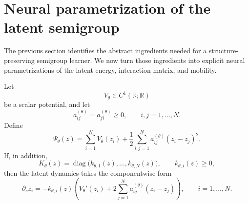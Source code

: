 \documentclass[hidelinks,review,nohypdvips,onefignum,onetabnum]{siamart220329}
\newcommand{\R}{\mathbb{R}}
\newcommand{\diag}{\operatorname{diag}}
\begin{document}
\section{Neural parametrization of the latent semigroup}\label{sec:neural-param}
The previous section identifies the abstract ingredients needed for a structure-preserving semigroup learner. We now turn those ingredients into explicit neural parametrizations of the latent energy, interaction matrix, and mobility.
\begin{definition}\label{def:rd-energy}
Let
\begin{equation}\label{eq:V-type}
V_{\theta}\in C^1(\R;\R)
\end{equation}
be a scalar potential, and let
\begin{equation}\label{eq:A-sym}
a_{ij}^{(\theta)}=a_{ji}^{(\theta)}\ge 0, \qquad i,j=1,\dots,N.
\end{equation}
Define
\begin{equation}\label{eq:rd-energy}
\Psi_{\theta}(z)=\sum_{i=1}^N V_{\theta}(z_i)+\frac12\sum_{i,j=1}^N a_{ij}^{(\theta)}(z_i-z_j)^2.
\end{equation}
If, in addition,
\begin{equation}\label{eq:diag-mobility}
K_{\theta}(z)=\diag\bigl(k_{\theta,1}(z),\dots,k_{\theta,N}(z)\bigr), \qquad k_{\theta,i}(z)\ge 0,
\end{equation}
then the latent dynamics takes the componentwise form
\begin{equation}\label{eq:component-flow}
\partial_s z_i=-k_{\theta,i}(z)\left(V_{\theta}'(z_i)+2\sum_{j=1}^N a_{ij}^{(\theta)}(z_i-z_j)\right), \qquad i=1,\dots,N.
\end{equation}
\end{definition}
\end{document}
